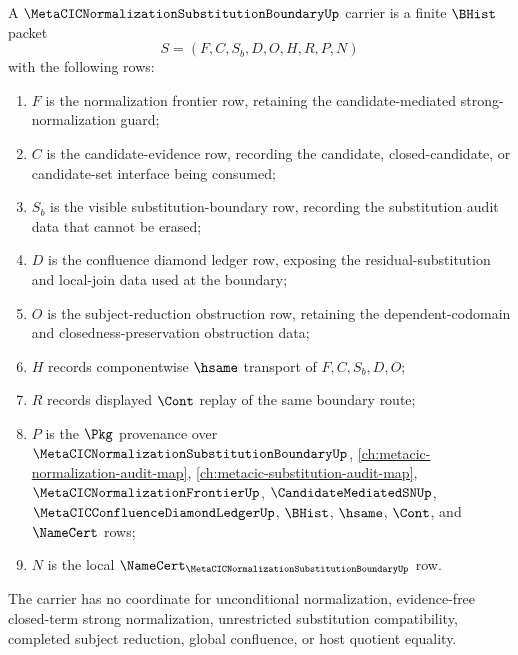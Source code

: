 \begin{definition}
\label{def:metacic-normalization-substitution-boundary-carrier}
A $\MetaCICNormalizationSubstitutionBoundaryUp$ carrier is a finite $\BHist$ packet
$$
S=(F,C,S_b,D,O,H,R,P,N)
$$
with the following rows:
\begin{enumerate}
\item $F$ is the normalization frontier row, retaining the candidate-mediated strong-normalization guard;
\item $C$ is the candidate-evidence row, recording the candidate, closed-candidate, or candidate-set interface being consumed;
\item $S_b$ is the visible substitution-boundary row, recording the substitution audit data that cannot be erased;
\item $D$ is the confluence diamond ledger row, exposing the residual-substitution and local-join data used at the boundary;
\item $O$ is the subject-reduction obstruction row, retaining the dependent-codomain and closedness-preservation obstruction data;
\item $H$ records componentwise $\hsame$ transport of $F,C,S_b,D,O$;
\item $R$ records displayed $\Cont$ replay of the same boundary route;
\item $P$ is the $\Pkg$ provenance over $\MetaCICNormalizationSubstitutionBoundaryUp$, \autoref{ch:metacic-normalization-audit-map}, \autoref{ch:metacic-substitution-audit-map}, $\MetaCICNormalizationFrontierUp$, $\CandidateMediatedSNUp$, $\MetaCICConfluenceDiamondLedgerUp$, $\BHist$, $\hsame$, $\Cont$, and $\NameCert$ rows;
\item $N$ is the local $\NameCert_{\MetaCICNormalizationSubstitutionBoundaryUp}$ row.
\end{enumerate}
The carrier has no coordinate for unconditional normalization, evidence-free closed-term strong normalization, unrestricted substitution compatibility, completed subject reduction, global confluence, or host quotient equality.
\end{definition}

